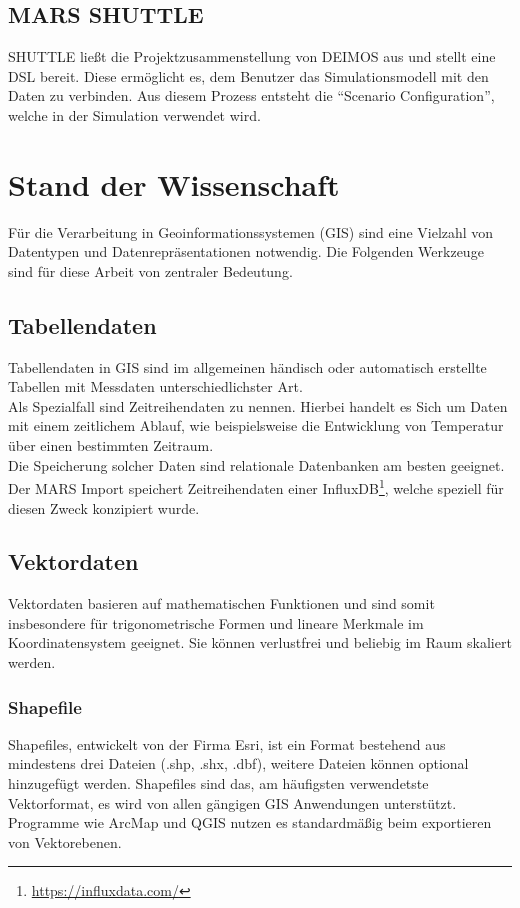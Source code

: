 \documentclass[10pt,conference,compsocconf]{IEEEtran}
\begin{document}
\subsection{MARS SHUTTLE}
SHUTTLE ließt die Projektzusammenstellung von DEIMOS aus und stellt eine DSL bereit. Diese ermöglicht es, dem Benutzer das Simulationsmodell mit den Daten zu verbinden. Aus diesem Prozess entsteht die \enquote{Scenario Configuration}, welche in der Simulation verwendet wird.\\



\section{Stand der Wissenschaft}
Für die Verarbeitung in Geoinformationssystemen (GIS) sind eine Vielzahl von Datentypen und Datenrepräsentationen notwendig. Die Folgenden Werkzeuge sind für diese Arbeit von zentraler Bedeutung.


\subsection{Tabellendaten}
Tabellendaten in GIS sind im allgemeinen händisch oder automatisch erstellte Tabellen mit Messdaten unterschiedlichster Art. \\
Als Spezialfall sind Zeitreihendaten zu nennen. Hierbei handelt es Sich um Daten mit einem zeitlichem Ablauf, wie beispielsweise die Entwicklung von Temperatur über einen bestimmten Zeitraum.\\
Die Speicherung solcher Daten sind relationale Datenbanken am besten geeignet. Der MARS Import speichert Zeitreihendaten einer InfluxDB\footnote{\url{https://influxdata.com/}}, welche speziell für diesen Zweck konzipiert wurde.


\subsection{Vektordaten}
Vektordaten basieren auf mathematischen Funktionen und sind somit insbesondere für trigonometrische Formen und lineare Merkmale im Koordinatensystem geeignet. Sie können verlustfrei und beliebig im Raum skaliert werden.

\subsubsection{Shapefile}
Shapefiles, entwickelt von der Firma Esri, ist ein Format bestehend aus mindestens drei Dateien (.shp, .shx, .dbf), weitere Dateien können optional hinzugefügt werden. Shapefiles sind das, am häufigsten verwendetste Vektorformat, es wird von allen gängigen GIS Anwendungen unterstützt. Programme wie ArcMap und QGIS nutzen es standardmäßig beim exportieren von Vektorebenen.
\end{document}
